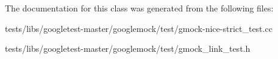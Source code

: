 The documentation for this class was generated from the following files\+:\begin{DoxyCompactItemize}
\item 
tests/libs/googletest-\/master/googlemock/test/gmock-\/nice-\/strict\+\_\+test.\+cc\item 
tests/libs/googletest-\/master/googlemock/test/gmock\+\_\+link\+\_\+test.\+h\end{DoxyCompactItemize}
